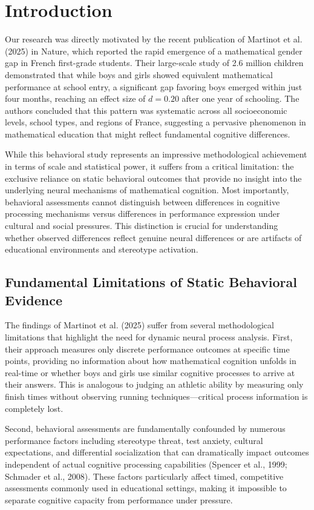 \documentclass[pdflatex,reference]{sn-jnl}%
\theoremstyle{thmstyleone}%
\theoremstyle{thmstyletwo}%
\theoremstyle{thmstylethree}%
\begin{document}
\section{Introduction}\label{sec1}
Our research was directly motivated by the recent publication of Martinot et al. (2025) in Nature, which reported the rapid emergence of a mathematical gender gap in French first-grade students. Their large-scale study of 2.6 million children demonstrated that while boys and girls showed equivalent mathematical performance at school entry, a significant gap favoring boys emerged within just four months, reaching an effect size of $d = 0.20$ after one year of schooling. The authors concluded that this pattern was systematic across all socioeconomic levels, school types, and regions of France, suggesting a pervasive phenomenon in mathematical education that might reflect fundamental cognitive differences.

While this behavioral study represents an impressive methodological achievement in terms of scale and statistical power, it suffers from a critical limitation: the exclusive reliance on static behavioral outcomes that provide no insight into the underlying neural mechanisms of mathematical cognition. Most importantly, behavioral assessments cannot distinguish between differences in cognitive processing mechanisms versus differences in performance expression under cultural and social pressures. This distinction is crucial for understanding whether observed differences reflect genuine neural differences or are artifacts of educational environments and stereotype activation.

\subsection{Fundamental Limitations of Static Behavioral Evidence}
The findings of Martinot et al. (2025) suffer from several methodological limitations that highlight the need for dynamic neural process analysis. First, their approach measures only discrete performance outcomes at specific time points, providing no information about how mathematical cognition unfolds in real-time or whether boys and girls use similar cognitive processes to arrive at their answers. This is analogous to judging an athletic ability by measuring only finish times without observing running techniques—critical process information is completely lost.

Second, behavioral assessments are fundamentally confounded by numerous performance factors including stereotype threat, test anxiety, cultural expectations, and differential socialization that can dramatically impact outcomes independent of actual cognitive processing capabilities (Spencer et al., 1999; Schmader et al., 2008). These factors particularly affect timed, competitive assessments commonly used in educational settings, making it impossible to separate cognitive capacity from performance under pressure.
\end{document}
